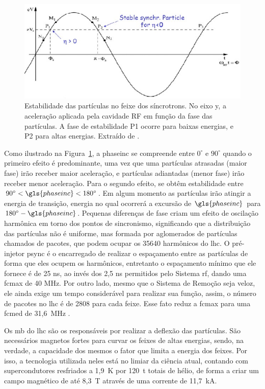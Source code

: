 \begin{figure}[h!t]
\centering
\includegraphics[width=.7\textwidth]{imagens/estabilidade_fase.png}
\caption[Estabilidade das partículas no feixe dos síncrotrons]{Estabilidade das partículas no feixe dos síncrotrons. No eixo y, a
aceleração aplicada pela cavidade RF em função da fase das partículas. 
A fase de estabilidade P1 ocorre para baixas energias, e P2 para altas energias. 
Extraído de \cite{lecture_slides_1}.}
\label{fig:est_sinc}
\end{figure}

Como ilustrado na Figura~\ref{fig:est_sinc}, a \gls{phaseinc} se compreende entre
$0^\circ$ e $90^\circ$ quando o primeiro efeito é predominante, uma vez que uma partículas 
atrasadas (maior fase) irão receber maior aceleração, 
e partículas adiantadas (menor fase) irão receber menor aceleração. Para o
segundo efeito, se obtêm estabilidade entre $90^\circ<\gls{phaseinc}<180^\circ$.
Em algum momento as partículas irão atingir a energia de transição, energia no
qual ocorrerá a excursão de $\gls{phaseinc}$ para $180^\circ - \gls{phaseinc}$. Pequenas
diferenças de fase criam um efeito de oscilação harmônica em torno dos pontos de
sincronismo, significando que a distribuição das partículas não é uniforme, mas
formada por aglomerados de partículas chamados de pacotes, que podem ocupar os
35640 harmônicos do \gls{lhc}. 
O pré-injetor \acrshort{psync} é o encarregado de realizar o espaçamento 
entre as partículas de forma que eles ocupem os harmônicos, entretanto o
espaçamento mínimo que ele fornece é de 25 ns, ao invés dos 2,5 ns permitidos
pelo Sistema \gls{rf}, dando uma \gls{fcmax} de 40 MHz. 
Por outro lado, mesmo que o Sistema de Remoção seja
veloz, ele ainda exige um tempo considerável para realizar sua função, assim, o
número de pacotes no \gls{lhc} é de 2808 para cada feixe. Esse fato reduz a
\gls{fcmax} para uma \gls{fcmed} de 31,6~MHz
\cite{closerLook,lhc_design,lecture_slides_1,lecture_slides_2}.


Os \gls{mb} do \gls{lhc} são os responsáveis por realizar a deflexão
das partículas.  São necessários magnetos fortes para curvar os feixes de altas
energias, sendo, na verdade, a capacidade dos mesmos o fator que limita a energia
dos feixes. Por isso, a tecnologia utilizada neles está no limiar da ciência
atual, contando com supercondutores resfriados a 1,9~K por 120~t totais de hélio, 
de forma a criar um campo magnético de até 8,3~T através de uma corrente de 11,7~kA. 

